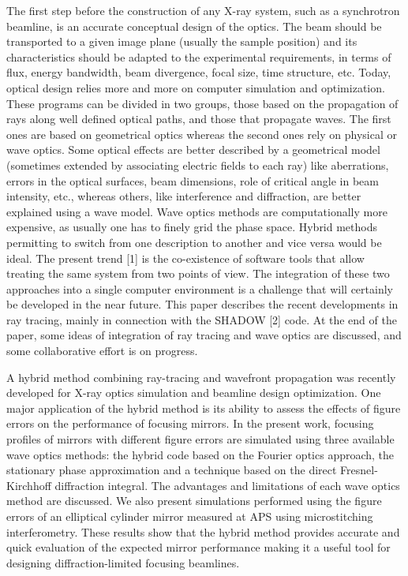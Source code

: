 \documentclass{aip-cp}
\begin{document}
The first step before the construction of any X-ray system, such as a synchrotron beamline, is an
accurate conceptual design of the optics. The beam should be transported to a given image plane
(usually the sample position) and its characteristics should be adapted to the experimental
requirements, in terms of flux, energy bandwidth, beam divergence, focal size, time structure, etc.
Today, optical design relies more and more on computer simulation and optimization. These programs
can be divided in two groups, those based on the propagation of rays along well defined optical paths,
and those that propagate waves. The first ones are based on geometrical optics whereas the second
ones rely on physical or wave optics. Some optical effects are better described by a geometrical model
(sometimes extended by associating electric fields to each ray) like aberrations, errors in the optical
surfaces, beam dimensions, role of critical angle in beam intensity, etc., whereas others, like
interference and diffraction, are better explained using a wave model. Wave optics methods are
computationally more expensive, as usually one has to finely grid the phase space. Hybrid methods
permitting to switch from one description to another and vice versa would be ideal. The present trend
[1] is the co-existence of software tools that allow treating the same system from two points of view.
The integration of these two approaches into a single computer environment is a challenge that will
certainly be developed in the near future. This paper describes the recent developments in ray tracing,
mainly in connection with the SHADOW [2] code. At the end of the paper, some ideas of integration
of ray tracing and wave optics are discussed, and some collaborative effort is on progress. 


A hybrid method combining ray-tracing and wavefront propagation was recently developed for X-ray optics simulation and beamline design optimization. One major application of the hybrid method is its ability to assess the effects of figure errors on the performance of focusing mirrors. In the present work, focusing profiles of mirrors with different figure errors are simulated using three available wave optics methods: the hybrid code based on the Fourier optics approach, the stationary phase approximation and a technique based on the direct Fresnel-Kirchhoff diffraction integral. The advantages and limitations of each wave optics method are discussed. We also present simulations performed using the figure errors of an elliptical cylinder mirror measured at APS using microstitching interferometry. These results show that the hybrid method provides accurate and quick evaluation of the expected mirror performance making it a useful tool for designing diffraction-limited focusing beamlines.
\end{document}
